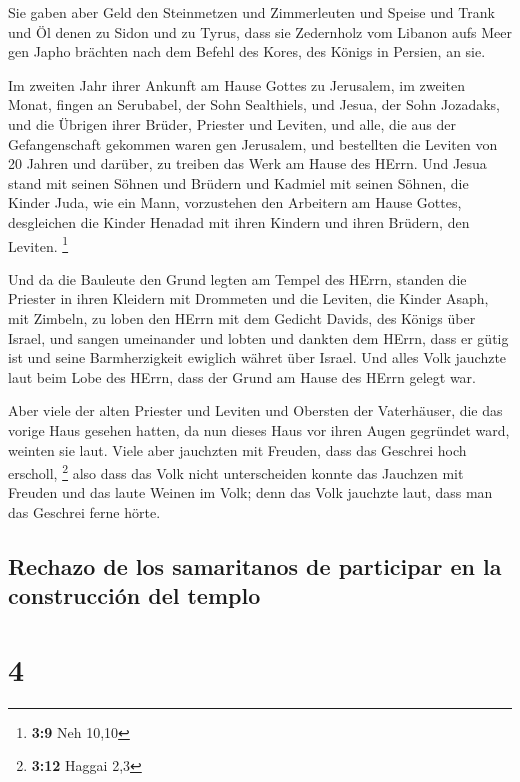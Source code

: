  Sie gaben aber Geld den Steinmetzen und Zimmerleuten und
Speise und Trank und Öl denen zu Sidon und zu Tyrus, dass sie Zedernholz
vom Libanon aufs Meer gen Japho brächten nach dem Befehl des Kores, des
Königs in Persien, an sie.

 Im zweiten Jahr ihrer Ankunft am Hause Gottes zu
Jerusalem, im zweiten Monat, fingen an Serubabel, der Sohn Sealthiels,
und Jesua, der Sohn Jozadaks, und die Übrigen ihrer Brüder, Priester und
Leviten, und alle, die aus der Gefangenschaft gekommen waren gen
Jerusalem, und bestellten die Leviten von 20 Jahren und darüber, zu
treiben das Werk am Hause des HErrn.  Und Jesua stand mit
seinen Söhnen und Brüdern und Kadmiel mit seinen Söhnen, die Kinder
Juda, wie ein Mann, vorzustehen den Arbeitern am Hause Gottes,
desgleichen die Kinder Henadad mit ihren Kindern und ihren Brüdern, den
Leviten. \footnote{\textbf{3:9} Neh 10,10}

 Und da die Bauleute den Grund legten am Tempel des
HErrn, standen die Priester in ihren Kleidern mit Drommeten und die
Leviten, die Kinder Asaph, mit Zimbeln, zu loben den HErrn mit dem
Gedicht Davids, des Königs über Israel,  und sangen
umeinander und lobten und dankten dem HErrn, dass er gütig ist und seine
Barmherzigkeit ewiglich währet über Israel. Und alles Volk jauchzte laut
beim Lobe des HErrn, dass der Grund am Hause des HErrn gelegt war.

 Aber viele der alten Priester und Leviten und Obersten
der Vaterhäuser, die das vorige Haus gesehen hatten, da nun dieses Haus
vor ihren Augen gegründet ward, weinten sie laut. Viele aber jauchzten
mit Freuden, dass das Geschrei hoch erscholl, \footnote{\textbf{3:12}
  Haggai 2,3}  also dass das Volk nicht unterscheiden
konnte das Jauchzen mit Freuden und das laute Weinen im Volk; denn das
Volk jauchzte laut, dass man das Geschrei ferne hörte.

\hypertarget{rechazo-de-los-samaritanos-de-participar-en-la-construcciuxf3n-del-templo}{%
\subsection{Rechazo de los samaritanos de participar en la construcción
del
templo}\label{rechazo-de-los-samaritanos-de-participar-en-la-construcciuxf3n-del-templo}}

\hypertarget{section-3}{%
\section{4}\label{section-3}}

